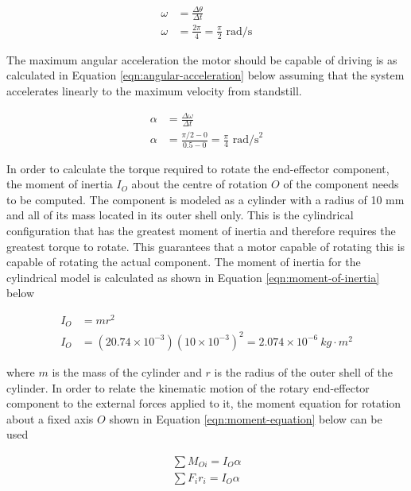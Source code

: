 \begin{align}
	\omega&=\frac{\Delta \theta}{\Delta t}
	\label{eqn:angular-velocity} \\
	\omega&=\frac{2\pi}{4}=\frac{\pi}{2} \text{ rad/s}
\end{align}

The maximum angular acceleration the motor should be capable of driving is as calculated in Equation \ref{eqn:angular-acceleration} below assuming that the system accelerates linearly to the maximum velocity from standstill.

\begin{align}
	\alpha&=\frac{\Delta \omega}{\Delta t} 
	\label{eqn:angular-acceleration} \\
	\alpha&=\frac{\pi / 2 - 0}{0.5 - 0}=\frac{\pi}{4} \text{ rad/s}^2
\end{align}

In order to calculate the torque required to rotate the end-effector component, the moment of inertia $I_O$ about the centre of rotation $O$ of the component needs to be computed. The component is modeled as a cylinder with a radius of 10 mm and all of its mass located in its outer shell only. This is the cylindrical configuration that has the greatest moment of inertia and therefore requires the greatest torque to rotate. This guarantees that a motor capable of rotating this is capable of rotating the actual component. The moment of inertia for the cylindrical model is calculated as shown in Equation \ref{eqn:moment-of-inertia} below

\begin{align}
	I_O&=mr^2
	\label{eqn:moment-of-inertia} \\
	I_O&=(20.74 \times 10^{-3})(10 \times 10^{-3})^2=2.074 \times 10^{-6} \: kg\cdot m^2
\end{align}

where $m$ is the mass of the cylinder and $r$ is the radius of the outer shell of the cylinder. In order to relate the kinematic motion of the rotary end-effector component to the external forces applied to it, the moment equation for rotation about a fixed axis $O$ shown in Equation \ref{eqn:moment-equation} below can be used

\begin{align}
	\sum M_{Oi} = I_O \alpha
	\label{eqn:moment-equation} \\
	\sum F_i r_i = I_O \alpha
\end{align}

